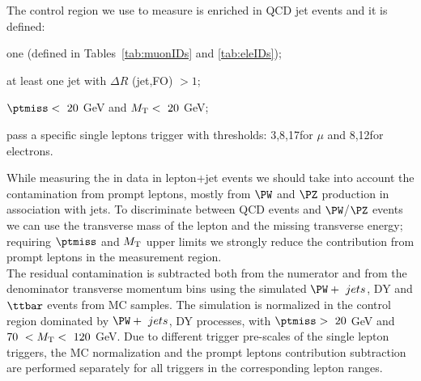 The control region we use to measure is enriched in QCD jet events and
it is defined:
\begin{itemize}
\setlength\itemsep{-0.2em}
  {\footnotesize
	\item one \fo (defined in Tables~\ref{tab:muonIDs} and \ref{tab:eleIDs});
	\item at least one jet with $\Delta R$ (jet,FO) $>1$;
	\item $\ptmiss < \ 20$ GeV and $M_{\mathrm{T}} < \ 20 $ GeV;
	\item pass a specific single leptons trigger with \pt thresholds:
          3,8,17\GeV for $\mu$ and 8,12\GeV for electrons.}
\end{itemize}

While measuring the \fr in data in lepton+jet events we should take into account the contamination from prompt leptons, mostly from $\PW$ and $\PZ$ production in association with jets.
 To discriminate between QCD events and $\PW$/$\PZ$ events we can use the transverse mass of the lepton and the missing transverse energy; requiring $\ptmiss$ and $M_{\mathrm{T}}$ upper limits we strongly reduce
  the contribution from prompt leptons in the measurement region. \\
The residual contamination is subtracted both from the numerator and from the denominator transverse momentum bins using the simulated $\PW + \ jets$, DY and $\ttbar$ events from MC samples. The simulation is normalized in the control region dominated by $\PW + \ jets$, DY processes, with $\ptmiss > \ 20$ GeV and $70 \ < M_{\mathrm{T}} < \ 120 $ GeV.
Due to different trigger pre-scales of the single lepton triggers, the
MC normalization and the prompt leptons contribution subtraction are
performed separately for all triggers in the corresponding lepton \pt ranges.


